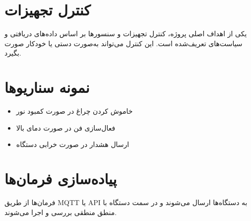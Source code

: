 \section{کنترل تجهیزات}

یکی از اهداف اصلی پروژه، کنترل تجهیزات و سنسورها بر اساس داده‌های دریافتی و سیاست‌های تعریف‌شده است. این کنترل می‌تواند به‌صورت دستی یا خودکار صورت بگیرد.

\section{نمونه سناریوها}

\begin{itemize}
    \item خاموش کردن چراغ در صورت کمبود نور
    \item فعال‌سازی فن در صورت دمای بالا
    \item ارسال هشدار در صورت خرابی دستگاه
\end{itemize}

\section{پیاده‌سازی فرمان‌ها}

فرمان‌ها از طریق MQTT یا API به دستگاه‌ها ارسال می‌شوند و در سمت دستگاه با منطق منطقی بررسی و اجرا می‌شوند.
